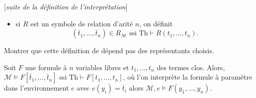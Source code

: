 \documentclass[./main]{subfiles}
\begin{document}
  [\textit{suite de la définition de l'interprétation}]

  \begin{itemize}
    \item si $R$ est un symbole de relation d'arité $n$, on définit 
      \[
        (\bar{t}_1, \ldots, \bar{t}_n) \in R_{\mathcal{M}} \text{ ssi }
        \mathrm{Th} \vdash  R(t_1, \ldots, t_n)
      .\] 
  \end{itemize}

  \begin{exo}
    Montrer que cette définition de dépend pas des représentants choisis.
  \end{exo}

  \begin{lem}
    Soit $F$ une formule à $n$ variables libres et $t_1 ,\ldots, t_n$ des termes clos.
    Alors, $\mathcal{M} \models F[\bar{t}_1, \ldots, \bar{t}_n]$ ssi $\mathrm{Th} \vdash F[t_1, \ldots, t_n]$,
    où l'on interprète la formule à paramètre dans l'environnement $e$ avec $e(y_i) = \bar{t}_i$ alors $\mathcal{M}, e \models F(y_1, \ldots, y_n)$.
  \end{lem}
\end{document}
